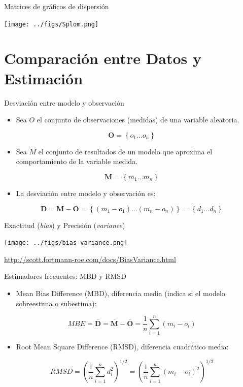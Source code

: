 \documentclass[aspectratio=169, usenames,svgnames,dvipsnames]{beamer}
\begin{document}
\begin{frame}[label={sec:orgdf1a793}]{Matrices de gráficos de dispersión}
\begin{center}
\texttt{[image: ../figs/Splom.png]}
\end{center}
\end{frame}

\section{Comparación entre Datos y Estimación}
\label{sec:org0810da5}

\begin{frame}[label={sec:orgb414505}]{Desviación entre modelo y observación}
\begin{itemize}
\item Sea \(O\) el conjunto de observaciones (medidas) de una variable aleatoria.
\end{itemize}

\[
\mathbf{O} = \left\{ o_1 \dots o_n \right\}
\]
\begin{itemize}
\item Sea \(M\) el conjunto de resultados de un modelo que aproxima el comportamiento de la variable medida.
\end{itemize}

\[
\mathbf{M} = \left\{ m_1 \dots m_n  \right\}
\]

\begin{itemize}
\item La desviación entre modelo y observación es:
\end{itemize}

\[
\mathbf{D} = \mathbf{M} - \mathbf{O} =  \left\{ (m_1 - o_1) \dots (m_n - o_n)  \right\} = \left\{ d_1 \dots d_n  \right\}
\]
\end{frame}

\begin{frame}[label={sec:org245feef}]{Exactitud (\emph{bias}) y Precisión (\emph{variance})}
\begin{center}
\texttt{[image: ../figs/bias-variance.png]}
\end{center}

\url{http://scott.fortmann-roe.com/docs/BiasVariance.html}
\end{frame}

\begin{frame}[label={sec:org3645d94}]{Estimadores frecuentes: MBD y RMSD}
\begin{itemize}
\item Mean Bias Difference (MBD), diferencia media (indica si el modelo sobreestima o subestima):
\end{itemize}
\[
MBE = \overline{\mathbf{D}} = \overline{\mathbf{M}} - \overline{\mathbf{O}} = \frac{1}{n} \sum_{i=1}^n (m_i - o_i)
\]

\begin{itemize}
\item Root Mean Square Difference (RMSD), diferencia cuadrático media:
\end{itemize}
\[
RMSD = \left(\frac{1}{n} \sum_{i=1}^n d_i^2 \right)^{1/2} =  \left( \frac{1}{n} \sum_{i=1}^n (m_i - o_i)^2  \right)^{1/2}
\]
\end{frame}
\end{document}
